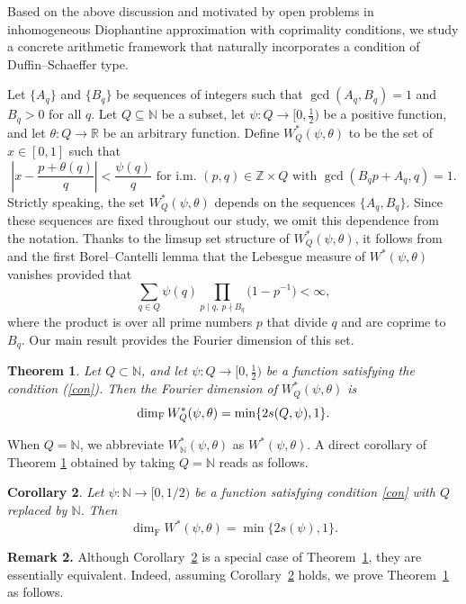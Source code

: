 \documentclass[12pt,a4paper,twoside]{article}
\newtheorem{thm}{Theorem}%
\newtheorem{cor}[thm]{Corollary}
\begin{document}
Based on the above discussion and motivated by open problems in inhomogeneous Diophantine approximation with coprimality conditions, we   study a concrete arithmetic framework that naturally incorporates a condition of Duffin--Schaeffer type.


Let $\{A_q\}$ and $\{B_q\}$ be sequences of integers such that $\gcd(A_q, B_q)=1$ and $B_q > 0$ for all $q$. Let $Q \subseteq \mathbb{N}$ be a  subset, let $\psi\colon Q \to [0, \tfrac{1}{2})$ be a positive function, and let $\theta\colon Q \to \mathbb{R}$ be an arbitrary function.
Define $W_{Q}^{\ast}(\psi,\theta)$ to be the set of $x\in[0,1]$ such that
\[
\left| x - \frac{p+\theta(q)}{q} \right|<\frac{\psi(q)}{q} \text{ for i.m. }(p,q)\in \mathbb{Z}\times Q \text{ with } \gcd(B_qp+A_q,q)=1.
\]
Strictly speaking, the set \({W}_{Q}^{\ast}(\psi,\theta)\) depends on the sequences \(\{A_q,B_q\}\). Since these sequences are fixed throughout our study, we omit this dependence from the notation. Thanks to the limsup set structure of \(W_{Q}^*(\psi,\theta)\), it follows from \cite[Proposition 1]{BHV24} and the first Borel--Cantelli lemma that the Lebesgue measure of $W^*(\psi,\theta)$ vanishes provided that
\begin{equation}\label{con}
\sum_{q\in Q} \psi(q) \prod_{{p\mid q, ~p\nmid B_q}} \bigl(1 - p^{-1}\bigr) < \infty,
\end{equation}
where the product is over all prime numbers $p$ that divide $q$ and are coprime to $B_q$.
Our main result provides the Fourier dimension of this set.


\begin{thm}\label{thm1}
Let $Q\subset \mathbb{N}$, and let $\psi\colon Q\to [0,\frac{1}{2})$ be a function satisfying the condition (\ref{con}).
Then the Fourier dimension of \(W_{Q}^*(\psi,\theta)\) is
$$\dim_{{\rm F}}W_Q^{\ast}(\psi,\theta)=\min\{2s(Q,\psi),1\}.$$
\end{thm}
When \(Q = \mathbb{N}\), we abbreviate \(W_{\mathbb{N}}^{\ast}(\psi,\theta)\) as \(W^{\ast}(\psi,\theta)\). A direct corollary of Theorem \ref{thm1} obtained by taking \(Q = \mathbb{N}\) reads as follows.

\begin{cor}\label{cor2}
Let \(\psi \colon \mathbb{N} \to [0, 1/2)\) be a function satisfying condition \eqref{con} with \(Q\) replaced by \(\mathbb{N}\). Then
\[
\dim_{\mathrm{F}} W^{\ast}(\psi,\theta) = \min\{2s(\psi), 1\}.
\]
\end{cor}

\noindent\textbf{Remark 2.} Although Corollary~\ref{cor2} is a special case of Theorem~\ref{thm1}, they are essentially equivalent. Indeed, assuming Corollary~\ref{cor2} holds, we prove Theorem~\ref{thm1} as follows.
\end{document}
